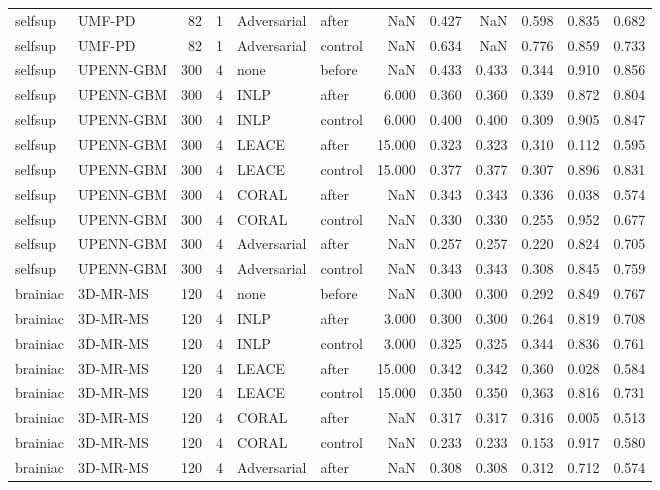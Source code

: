 \begin{tabular}{llrrllrrrrrr}
selfsup & UMF-PD & 82 & 1 & Adversarial & after & NaN & 0.427 & NaN & 0.598 & 0.835 & 0.682 \\
selfsup & UMF-PD & 82 & 1 & Adversarial & control & NaN & 0.634 & NaN & 0.776 & 0.859 & 0.733 \\
selfsup & UPENN-GBM & 300 & 4 & none & before & NaN & 0.433 & 0.433 & 0.344 & 0.910 & 0.856 \\
selfsup & UPENN-GBM & 300 & 4 & INLP & after & 6.000 & 0.360 & 0.360 & 0.339 & 0.872 & 0.804 \\
selfsup & UPENN-GBM & 300 & 4 & INLP & control & 6.000 & 0.400 & 0.400 & 0.309 & 0.905 & 0.847 \\
selfsup & UPENN-GBM & 300 & 4 & LEACE & after & 15.000 & 0.323 & 0.323 & 0.310 & 0.112 & 0.595 \\
selfsup & UPENN-GBM & 300 & 4 & LEACE & control & 15.000 & 0.377 & 0.377 & 0.307 & 0.896 & 0.831 \\
selfsup & UPENN-GBM & 300 & 4 & CORAL & after & NaN & 0.343 & 0.343 & 0.336 & 0.038 & 0.574 \\
selfsup & UPENN-GBM & 300 & 4 & CORAL & control & NaN & 0.330 & 0.330 & 0.255 & 0.952 & 0.677 \\
selfsup & UPENN-GBM & 300 & 4 & Adversarial & after & NaN & 0.257 & 0.257 & 0.220 & 0.824 & 0.705 \\
selfsup & UPENN-GBM & 300 & 4 & Adversarial & control & NaN & 0.343 & 0.343 & 0.308 & 0.845 & 0.759 \\
brainiac & 3D-MR-MS & 120 & 4 & none & before & NaN & 0.300 & 0.300 & 0.292 & 0.849 & 0.767 \\
brainiac & 3D-MR-MS & 120 & 4 & INLP & after & 3.000 & 0.300 & 0.300 & 0.264 & 0.819 & 0.708 \\
brainiac & 3D-MR-MS & 120 & 4 & INLP & control & 3.000 & 0.325 & 0.325 & 0.344 & 0.836 & 0.761 \\
brainiac & 3D-MR-MS & 120 & 4 & LEACE & after & 15.000 & 0.342 & 0.342 & 0.360 & 0.028 & 0.584 \\
brainiac & 3D-MR-MS & 120 & 4 & LEACE & control & 15.000 & 0.350 & 0.350 & 0.363 & 0.816 & 0.731 \\
brainiac & 3D-MR-MS & 120 & 4 & CORAL & after & NaN & 0.317 & 0.317 & 0.316 & 0.005 & 0.513 \\
brainiac & 3D-MR-MS & 120 & 4 & CORAL & control & NaN & 0.233 & 0.233 & 0.153 & 0.917 & 0.580 \\
brainiac & 3D-MR-MS & 120 & 4 & Adversarial & after & NaN & 0.308 & 0.308 & 0.312 & 0.712 & 0.574 \\

\end{tabular}
